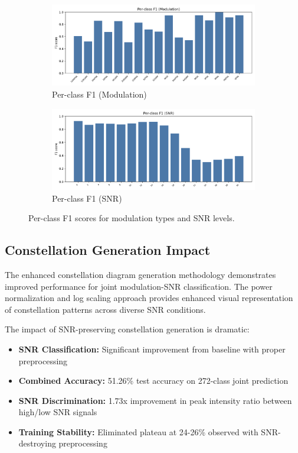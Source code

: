 \documentclass{ELSP}
\begin{document}
\begin{figure}[t]
  \centering
  \begin{subfigure}[t]{0.48\linewidth}
    \centering
    \includegraphics[width=\linewidth]{fig/f1_modulation_bar.png}
    \caption{Per-class F1 (Modulation)}
  \end{subfigure}\hfill
  \begin{subfigure}[t]{0.48\linewidth}
    \centering
    \includegraphics[width=\linewidth]{fig/f1_snr_bar.png}
    \caption{Per-class F1 (SNR)}
  \end{subfigure}
  \caption{Per-class F1 scores for modulation types and SNR levels.}
  \label{fig:f1_plots}
\end{figure}

\subsection{Constellation Generation Impact}

The enhanced constellation diagram generation methodology demonstrates improved performance for joint modulation-SNR classification. The power normalization and log scaling approach provides enhanced visual representation of constellation patterns across diverse SNR conditions.

The impact of SNR-preserving constellation generation is dramatic:

\begin{itemize}
    \item \textbf{SNR Classification:} Significant improvement from baseline with proper preprocessing
    \item \textbf{Combined Accuracy:} 51.26\% test accuracy on 272-class joint prediction
    \item \textbf{SNR Discrimination:} 1.73x improvement in peak intensity ratio between high/low SNR signals
    \item \textbf{Training Stability:} Eliminated plateau at 24-26\% observed with SNR-destroying preprocessing
\end{itemize}
\end{document}

